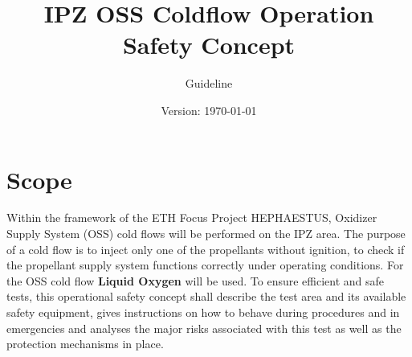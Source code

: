 \documentclass{article}
\title{IPZ OSS Coldflow Operation Safety Concept}
\author{Guideline}
\date{Version: \isodate\today}
\begin{document}
\maketitle

\thispagestyle{fancy}

\section{Scope}

Within the framework of the ETH Focus Project HEPHAESTUS, Oxidizer Supply System (OSS) cold flows will be performed on the IPZ area. The purpose of a cold flow is to inject only one of the propellants without ignition, to check if the propellant supply system functions correctly under operating conditions.  
\noindent
For the OSS cold flow \textbf{Liquid Oxygen} will be used. To ensure efficient and safe tests, this operational safety concept shall describe the test area and its available safety equipment, gives instructions on how to behave during procedures and in emergencies and analyses the major risks associated with this test as well as the protection mechanisms in place.
\end{document}

